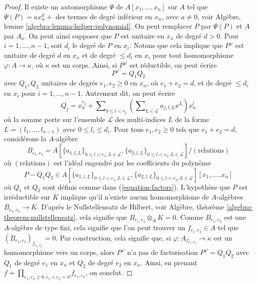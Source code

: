 \begin{proof}
Il existe un automorphisme $\Psi$ de $A[x_1, \ldots, x_n]$ sur $A$
tel que $\Psi(P) = ax_n^d +$ des termes de degré inférieur en $x_n$, avec
$a \not = 0$, voir
Algèbre, lemme \ref{algebra-lemma-helper-polynomial}.
On peut remplacer $P$ par $\Psi(P)$ et $A$ par $A_a$.
On peut ainsi supposer que $P$ est unitaire en $x_n$ de degré $d > 0$.
Pour $i = 1, \ldots, n - 1$, soit $d_i$ le degré de $P$ en $x_i$.
Notons que cela implique que $P^\varphi$ est unitaire de degré $d$ en $x_n$
et de degré $\leq d_i$ en $x_i$ pour tout homomorphisme
$\varphi : A \to \kappa$, où $\kappa$ est un corps.
Ainsi, si $P^\varphi$ est réductible, on peut écrire
$$
P^\varphi = Q_1 Q_2
$$
avec $Q_1, Q_2$ unitaires de degrés $e_1, e_2 \geq 0$ en $x_n$, où
$e_1 + e_2 = d$, et de degré $\leq d_i$ en $x_i$ pour
$i = 1, \ldots, n - 1$. Autrement dit, on peut écrire
\begin{equation}
\label{equation-factors}
Q_j = x_n^{e_j} + \sum\nolimits_{0 \leq l < e_j}
\left( \sum\nolimits_{L \in \mathcal{L}} a_{j, l, L} x^L \right) x_n^l
\end{equation}
où la somme porte sur l'ensemble $\mathcal{L}$ des multi-indices $L$
de la forme $L = (l_1, \ldots, l_{n - 1})$ avec $0 \leq l_i \leq d_i$.
Pour tous $e_1, e_2 \geq 0$ tels que $e_1 + e_2 = d$, considérons la $A$-algèbre
$$
B_{e_1, e_2} =
A[\{a_{1, l, L}\}_{0 \leq l < e_1, L \in \mathcal{L}},
\{a_{2, l, L}\}_{0 \leq l < e_2, L \in \mathcal{L}}]/(\text{relations})
$$
où $(\text{relations})$ est l'idéal engendré par les coefficients
du polynôme
$$
P - Q_1Q_2 \in
A[\{a_{1, l, L}\}_{0 \leq l < e_1, L \in \mathcal{L}},
\{a_{2, l, L}\}_{0 \leq l < e_2, L \in \mathcal{L}}][x_1, \ldots, x_n]
$$
où $Q_1$ et $Q_2$ sont définis comme dans (\ref{equation-factors}).
L'hypothèse que $P$ est irréductible sur $\overline{K}$ implique qu'il
n'existe aucun homomorphisme de $A$-algèbres
$B_{e_1, e_2} \to \overline{K}$. D'après le Nullstellensatz de Hilbert, voir
Algèbre, théorème \ref{algebra-theorem-nullstellensatz},
cela signifie que $B_{e_1, e_2} \otimes_A K = 0$.
Comme $B_{e_1, e_2}$ est une $A$-algèbre de type fini, cela signifie que
l'on peut trouver un $f_{e_1, e_2} \in A$ tel que
$(B_{e_1, e_2})_{f_{e_1, e_2}} = 0$. Par construction, cela signifie que,
si $\varphi : A_{f_{e_1, e_2}} \to \kappa$ est un homomorphisme vers un corps,
alors $P^\varphi$ n'a pas de factorisation $P^\varphi = Q_1 Q_2$
avec $Q_1$ de degré $e_1$ en $x_n$ et $Q_2$ de degré $e_2$ en $x_n$.
Ainsi, en prenant
$f = \prod_{e_1, e_2 \geq 0, e_1 + e_2 = d} f_{e_1, e_2}$, on conclut.
\end{proof}

